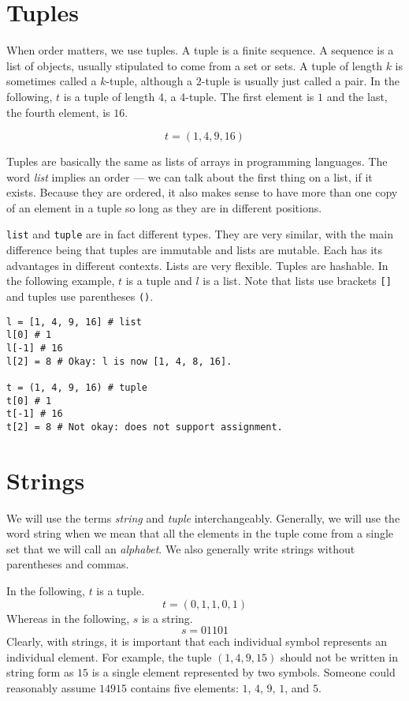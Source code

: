 \documentclass{iansnotes}
\begin{document}
\section{Tuples}
  When order matters, we use tuples.
  A tuple is a finite sequence\autocite[6]{sipser}.
  A sequence is a list of objects, usually stipulated to come from a set or sets.
  A tuple of length $k$ is sometimes called a $k$-tuple, although a $2$-tuple is usually just called a pair.
  In the following, $t$ is a tuple of length $4$, a $4$-tuple.
  The first element is $1$ and the last, the fourth element, is $16$.

  \[ t = (1, 4, 9, 16) \]

  Tuples are basically the same as lists of arrays in programming languages.
  The word \emph{list} implies an order --- we can talk about the first thing on a list, if it exists.
  Because they are ordered, it also makes sense to have more than one copy of an element in a tuple so long as they are in different positions.

   \texttt{list} and \texttt{tuple} are in fact different types.
  They are very similar, with the main difference being that tuples are immutable and lists are mutable.
  Each has its advantages in different contexts.
  Lists are very flexible.
  Tuples are hashable.
  In the following example, $t$ is a tuple and $l$ is a list.
  Note that lists use brackets \texttt{[]} and tuples use parentheses \texttt{()}.

\begin{verbatim}
l = [1, 4, 9, 16] # list
l[0] # 1
l[-1] # 16
l[2] = 8 # Okay: l is now [1, 4, 8, 16].

t = (1, 4, 9, 16) # tuple
t[0] # 1
t[-1] # 16
t[2] = 8 # Not okay: does not support assignment.
\end{verbatim}


\section{Strings}
  We will use the terms \emph{string} and \emph{tuple} interchangeably\autocite[14]{sipser}.
  Generally, we will use the word string when we mean that all the elements in the tuple come from a single set that we will call an \emph{alphabet}.
  We also generally write strings without parentheses and commas.
  
  In the following, $t$ is a tuple.
  \[ t = (0, 1, 1, 0, 1) \]
  Whereas in the following, $s$ is a string.
  \[ s = 01101 \]
  Clearly, with strings, it is important that each individual symbol represents an individual element.
  For example, the tuple $(1, 4, 9 ,15)$ should not be written in string form as $15$ is a single element represented by two symbols.
  Someone could reasonably assume $14915$ contains five elements: $1$, $4$, $9$, $1$, and $5$.
\end{document}
